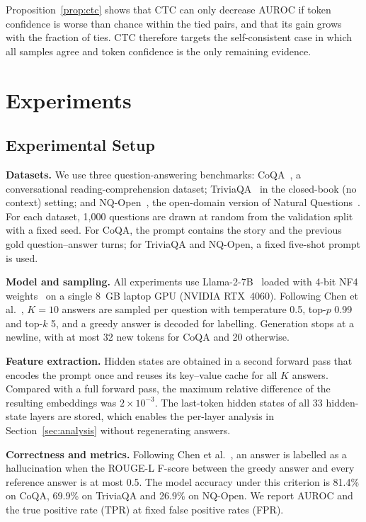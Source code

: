 \documentclass[conference]{IEEEtran}
\begin{document}
Proposition~\ref{prop:ctc} shows that CTC can only decrease AUROC if token confidence is worse than chance within the tied pairs, and that its gain grows with the fraction of ties. CTC therefore targets the self-consistent case in which all samples agree and token confidence is the only remaining evidence.

\section{Experiments}\label{sec:experiments}
\subsection{Experimental Setup}
\textbf{Datasets.} We use three question-answering benchmarks: CoQA~\cite{reddy2019coqa}, a conversational reading-comprehension dataset; TriviaQA~\cite{joshi2017triviaqa} in the closed-book (no context) setting; and NQ-Open~\cite{lee2019latent}, the open-domain version of Natural Questions~\cite{kwiatkowski2019natural}. For each dataset, 1,000 questions are drawn at random from the validation split with a fixed seed. For CoQA, the prompt contains the story and the previous gold question--answer turns; for TriviaQA and NQ-Open, a fixed five-shot prompt is used.

\textbf{Model and sampling.} All experiments use Llama-2-7B~\cite{touvron2023llama} loaded with 4-bit NF4 weights~\cite{dettmers2023qlora} on a single 8~GB laptop GPU (NVIDIA RTX~4060). Following Chen et al.~\cite{chen2024inside}, $K=10$ answers are sampled per question with temperature 0.5, top-$p$ 0.99 and top-$k$ 5, and a greedy answer is decoded for labelling. Generation stops at a newline, with at most 32 new tokens for CoQA and 20 otherwise.

\textbf{Feature extraction.} Hidden states are obtained in a second forward pass that encodes the prompt once and reuses its key--value cache for all $K$ answers. Compared with a full forward pass, the maximum relative difference of the resulting embeddings was $2\times10^{-3}$. The last-token hidden states of all 33 hidden-state layers are stored, which enables the per-layer analysis in Section~\ref{sec:analysis} without regenerating answers.

\textbf{Correctness and metrics.} Following Chen et al.~\cite{chen2024inside}, an answer is labelled as a hallucination when the ROUGE-L F-score between the greedy answer and every reference answer is at most 0.5. The model accuracy under this criterion is 81.4\% on CoQA, 69.9\% on TriviaQA and 26.9\% on NQ-Open. We report AUROC and the true positive rate (TPR) at fixed false positive rates (FPR).
\end{document}
